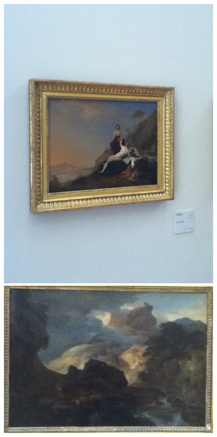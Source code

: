 \begin{figure}
  
  \begin{minipage}[c]{.33\linewidth}
    \centering
    \includegraphics[width=\textwidth, angle=270]{figures/5B-0506.JPG}
  \end{minipage} \hfill
  \begin{minipage}[c]{.33\linewidth}
    \centering
    \includegraphics[width=\textwidth]{figures/2.png}

\end{minipage}
\end{figure}
